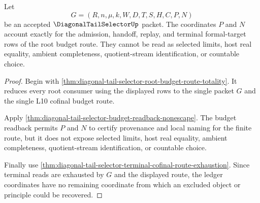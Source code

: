 \begin{theorem}
\label{thm:diagonal-tail-selector-root-budget-ledger-exactness}
Let
$$
G=(R,n,\mu,k,W,D,T,S,H,C,P,N)
$$
be an accepted $\DiagonalTailSelectorUp$ packet. The coordinates $P$ and $N$
account exactly for the admission, handoff, replay, and terminal
formal-target rows of the root budget route. They cannot be read as selected
limits, host real equality, ambient completeness, quotient-stream
identification, or countable choice.
\end{theorem}
\begin{proof}
Begin with
\autoref{thm:diagonal-tail-selector-root-budget-route-totality}. It reduces
every root consumer using the displayed rows to the single packet $G$ and the
single L10 cofinal budget route.

Apply \autoref{thm:diagonal-tail-selector-budget-readback-nonescape}. The
budget readback permits $P$ and $N$ to certify provenance and local naming for
the finite route, but it does not expose selected limits, host real equality,
ambient completeness, quotient-stream identification, or countable choice.

Finally use
\autoref{thm:diagonal-tail-selector-terminal-cofinal-route-exhaustion}. Since
terminal reads are exhausted by $G$ and the displayed route, the ledger
coordinates have no remaining coordinate from which an excluded object or
principle could be recovered.
\end{proof}

